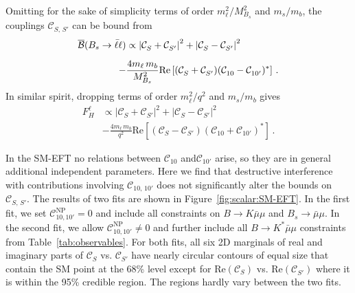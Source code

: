 \documentclass[twocolumn,epjc3]{svjour3}
\numberwithin{equation}{section}
\def \reffig#1{Figure~\ref{#1}}
\def \reftab#1{Table~\ref{#1}}
\newcommand{\wilson}[2][{}]{\mathcal{C}_{#2}^{\mathrm{#1}}}
\renewcommand{\[}{\big[}
\renewcommand{\]}{\big]}
\renewcommand{\(}{\big(}
\renewcommand{\)}{\big)}
\begin{document}
Omitting for the sake of simplicity terms of order $m_\ell^2/M_{B_s}^2$ and
$m_s/m_b$, the couplings $\wilson{S,\, S'}$ can be bound from~\cite{Alonso:2014csa}
\begin{equation}
\begin{aligned}
  \overline{\cal B}(B_s\to \bar\ell\ell) & \propto
      \left|\wilson{S} + \wilson{S'}\right|^2
    + \left|\wilson{S} - \wilson{S'}\right|^2
\\[0.2cm]
  - & \frac{4 m_\ell\, m_b}{M_{B_s}^2} \mbox{Re}
  \left[ (\wilson{S} + \wilson{S'})(\wilson{10} - \wilson{10'})^* \right] \,.
\end{aligned}
\end{equation}
In similar spirit, dropping terms of order $m_\ell^2/q^2$ and
$m_s/m_b$ gives
\begin{equation}
\begin{aligned}
  F_H^\ell & \propto
      \left|\wilson{S} + \wilson{S'}\right|^2
    + \left|\wilson{S} - \wilson{S'}\right|^2
\\[0.2cm]
  & - \frac{4 m_\ell\, m_b}{q^2} \mbox{Re}
  \left[ (\wilson{S} - \wilson{S'})(\wilson{10} + \wilson{10'})^* \right] \,.
\end{aligned}
\end{equation}

In the SM-EFT no relations between $\wilson{10}$ and$\wilson{10'}$ arise,
so they are in general additional independent parameters. Here
we find that destructive interference with contributions involving
$\wilson{10,\, 10'}$ does not significantly alter the bounds on $\wilson{S,\,
  S'}$.  The results of two fits are shown in \reffig{fig:scalar:SM-EFT}. In the
first fit, we set $\wilson[NP]{10, 10'} = 0$ and include all constraints on
{$B \to K \bar\mu\mu$ and $B_s \to \bar\mu\mu$}. In the second fit, we allow
$\wilson[NP]{10, 10'} \ne 0$ and further include all {$B \to K^* \bar\mu\mu$}
constraints from \reftab{tab:observables}. For both fits, all six 2D marginals
of real and imaginary parts of $\wilson{S}$ vs. $\wilson{S'}$ have nearly
circular contours of equal size that contain the SM point at the 68\% level
except for $\mbox{Re}(\wilson{S})$ vs. $\mbox{Re}(\wilson{S'})$ where it is
within the 95\% credible region. The regions hardly vary between the two fits.
\end{document}
